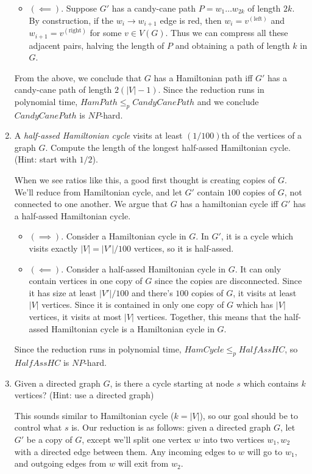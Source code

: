 \documentclass[fleqn]{article}
\begin{document}
\begin{enumerate}
\begin{answer}
\begin{itemize}
            \item $(\impliedby)$. Suppose $G'$ has a candy-cane path $P = w_1 \dots w_{2k}$ of length $2k$. By construction, if the $w_{i} \to w_{i+1}$ edge is red, then $w_i = v^{(\text{left})}$ and $w_{i+1} = v^{(\text{right})}$ for some $v \in V(G)$. Thus we can compress all these adjacent pairs, halving the length of $P$ and obtaining a path of length $k$ in $G$.
        \end{itemize}
        From the above, we conclude that $G$ has a Hamiltonian path iff $G'$ has a candy-cane path of length $2(|V| - 1)$. Since the reduction runs in polynomial time, $HamPath \leq_p CandyCanePath$ and we conclude $CandyCanePath$ is $NP$-hard.
    \end{answer}
    \item A \textit{half-assed Hamiltonian cycle} visits at least $(1/100)$th of the vertices of a graph $G$. Compute the length of the longest half-assed Hamiltonian cycle. (Hint: start with $1/2$).
    \begin{answer}
        When we see ratios like this, a good first thought is creating copies of $G$. We'll reduce from Hamiltonian cycle, and let $G'$ contain $100$ copies of $G$, not connected to one another. We argue that $G$ has a hamiltonian cycle iff $G'$ has a half-assed Hamiltonian cycle.
        \begin{itemize}
            \item $(\implies)$. Consider a Hamiltonian cycle in $G$. In $G'$, it is a cycle which visits exactly $|V| = |V'|/100$ vertices, so it is half-assed.
            \item $(\impliedby)$. Consider a half-assed Hamiltonian cycle in $G$. It can only contain vertices in one copy of $G$ since the copies are disconnected. Since it has size at least $|V'|/100$ and there's $100$ copies of $G$, it visits at least $|V|$ vertices. Since it is contained in only one copy of $G$ which has $|V|$ vertices, it visits at most $|V|$ vertices. Together, this means that the half-assed Hamiltonian cycle is a Hamiltonian cycle in $G$.
        \end{itemize}
        Since the reduction runs in polynomial time, $HamCycle \leq_p HalfAssHC$, so $HalfAssHC$ is $NP$-hard.
    \end{answer}
    \item Given a directed graph $G$, is there a cycle starting at node $s$ which contains $k$ vertices? (Hint: use a directed graph)
    \begin{answer}
        This sounds similar to Hamiltonian cycle ($k = |V|$), so our goal should be to control what $s$ is. Our reduction is as follows: given a directed graph $G$, let $G'$ be a copy of $G$, except we'll split one vertex $w$ into two vertices $w_1, w_2$ with a directed edge between them. Any incoming edges to $w$ will go to $w_1$, and outgoing edges from $w$ will exit from $w_2$.

\end{answer}
\end{enumerate}
\end{document}
